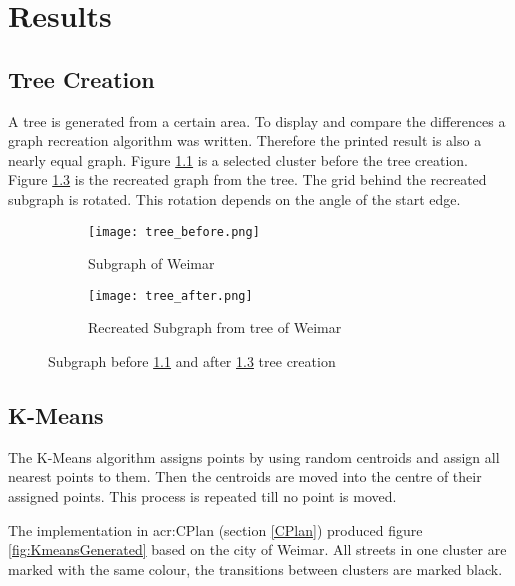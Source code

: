\pagebreak
\chapter{Results}
\section{Tree Creation}
A tree is generated from a certain area. To display and compare the differences a graph recreation algorithm was written. Therefore the printed result is also a nearly equal graph. Figure \ref{fig:tree_example} is a selected cluster before the tree creation. Figure \ref{fig:tree_example_after} is the recreated graph from the tree. The grid behind the recreated subgraph is rotated. This rotation depends on the angle of the start edge.

\begin{figure}[hb]
    \centering
    \begin{subfigure}[b]{0.5\textwidth}
        \begin{mdframed}[style=mdthight]
            \texttt{[image: tree\_before.png]}
        \end{mdframed}
        \caption{Subgraph of Weimar}
        \label{fig:tree_example}
    \end{subfigure}
    \quad
    \begin{subfigure}[b]{0.5\textwidth}
        \begin{mdframed}[style=mdthight]
            \texttt{[image: tree\_after.png]}
        \end{mdframed}
        \caption{Recreated Subgraph from tree of Weimar}
        \label{fig:tree_example_after}
    \end{subfigure}
    \caption{Subgraph before \ref{fig:tree_example} and after \ref{fig:tree_example_after} tree creation}
\end{figure}

\FloatBarrier
\section{K-Means}
The K-Means algorithm assigns points by using random centroids and assign all nearest points to them. Then the centroids are moved into the centre of their assigned points. This process is repeated till no point is moved.

The implementation in \acrshort{acr:CPlan} (section \ref{CPlan}) produced figure \ref{fig:KmeansGenerated} based on the city of Weimar. All streets in one cluster are marked with the same colour, the transitions between clusters are marked black.

